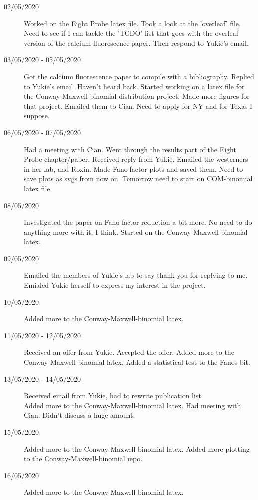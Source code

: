 \documentclass[a4paper,12pt]{article}
\theoremstyle{definition}
\begin{document}
\begin{description}
	\item[02/05/2020] Worked on the Eight Probe latex file. Took a look at the 'overleaf' file. Need to see if I can tackle the 'TODO' list that goes with the overleaf version of the calcium fluorescence paper. Then respond to Yukie's email.

	\item[03/05/2020 - 05/05/2020] Got the calcium fluorescence paper to compile with a bibliography. Replied to Yukie's email. Haven't heard back. Started working on a latex file for the Conway-Maxwell-binomial distribution project. Made more figures for that project. Emailed them to Cian. Need to apply for NY and for Texas I suppose.

	\item[06/05/2020 - 07/05/2020] Had a meeting with Cian. Went through the results part of the Eight Probe chapter/paper. Received reply from Yukie. Emailed the westerners in her lab, and Roxin. Made Fano factor plots and saved them. Need to save plots as svgs from now on. Tomorrow need to start on COM-binomial latex file.

	\item[08/05/2020] Investigated the paper on Fano factor reduction a bit more. No need to do anything more with it, I think. Started on the Conway-Maxwell-binomial latex.

	\item[09/05/2020] Emailed the members of Yukie's lab to say thank you for replying to me. Emialed Yukie herself to express my interest in the project.

	\item[10/05/2020] Added more to the Conway-Maxwell-binomial latex.

	\item[11/05/2020 - 12/05/2020] Received an offer from Yukie. Accepted the offer. Added more to the Conway-Maxwell-binomial latex. Added a statistical test to the Fanos bit.

	\item[13/05/2020 - 14/05/2020] Received email from Yukie, had to rewrite publication list. \\ Added more to the Conway-Maxwell-binomial latex. Had meeting with Cian. Didn't discuss a huge amount.

	\item[15/05/2020] Added more to the Conway-Maxwell-binomial latex. Added more plotting to the Conway-Maxwell-binomial repo.

	\item[16/05/2020] Added more to the Conway-Maxwell-binomial latex.


\end{description}
\end{document}
